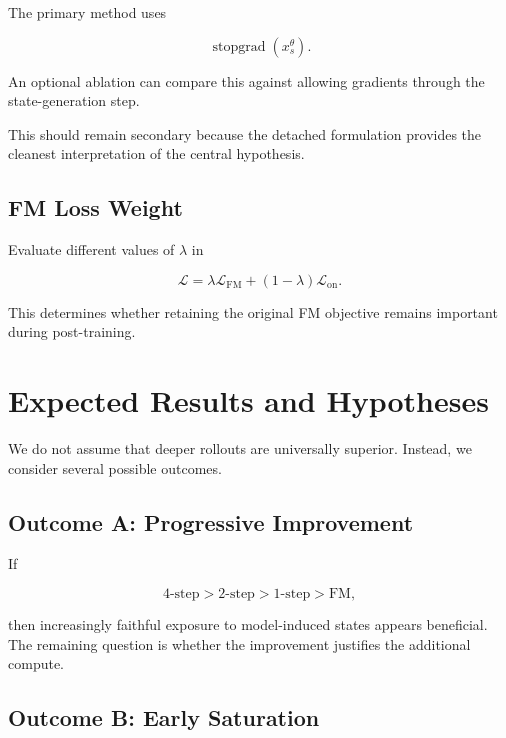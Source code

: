 \documentclass[11pt]{article}
\begin{document}
The primary method uses

\begin{equation}
\operatorname{stopgrad}(x_s^\theta).
\end{equation}

An optional ablation can compare this against allowing gradients through the
state-generation step.

This should remain secondary because the detached formulation provides the
cleanest interpretation of the central hypothesis.

\subsection{FM Loss Weight}

Evaluate different values of $\lambda$ in

\begin{equation}
\mathcal{L}
=
\lambda\mathcal{L}_{\mathrm{FM}}
+
(1-\lambda)\mathcal{L}_{\mathrm{on}}.
\end{equation}

This determines whether retaining the original FM objective remains important
during post-training.

\section{Expected Results and Hypotheses}

We do not assume that deeper rollouts are universally superior. Instead, we
consider several possible outcomes.

\subsection{Outcome A: Progressive Improvement}

If

\begin{equation}
\mathrm{4\text{-}step}
>
\mathrm{2\text{-}step}
>
\mathrm{1\text{-}step}
>
\mathrm{FM},
\end{equation}

then increasingly faithful exposure to model-induced states appears beneficial.
The remaining question is whether the improvement justifies the additional
compute.

\subsection{Outcome B: Early Saturation}
\end{document}
